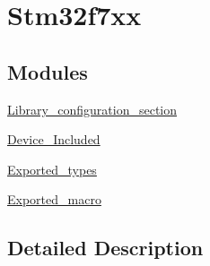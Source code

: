 \hypertarget{group__stm32f7xx}{}\section{Stm32f7xx}
\label{group__stm32f7xx}
\subsection*{Modules}
\begin{DoxyCompactItemize}
\item 
\mbox{\hyperlink{group___library__configuration__section}{Library\+\_\+configuration\+\_\+section}}
\item 
\mbox{\hyperlink{group___device___included}{Device\+\_\+\+Included}}
\item 
\mbox{\hyperlink{group___exported__types}{Exported\+\_\+types}}
\item 
\mbox{\hyperlink{group___exported__macro}{Exported\+\_\+macro}}
\end{DoxyCompactItemize}


\subsection{Detailed Description}
